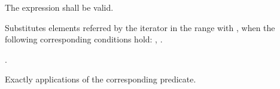 \begin{itemdescr}
\begin{removedblock}
\pnum
\requires
The expression
shall be valid.
\end{removedblock}

\pnum
\effects
Substitutes elements referred by the iterator
in the range 
with ,
when the following corresponding conditions hold:
,
.

\begin{addedblock}
\pnum
\returns
{}.
\end{addedblock}

\pnum
\complexity
Exactly
applications of the corresponding predicate.
\end{itemdescr}

